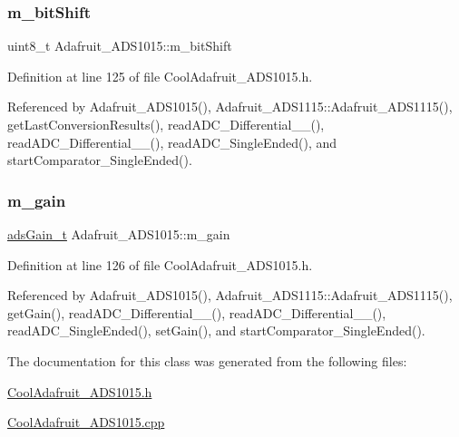 \subsubsection{\texorpdfstring{m\+\_\+bit\+Shift}{m\_bitShift}}
{\footnotesize\ttfamily uint8\+\_\+t Adafruit\+\_\+\+A\+D\+S1015\+::m\+\_\+bit\+Shift\hspace{0.3cm}{\ttfamily [protected]}}



Definition at line 125 of file Cool\+Adafruit\+\_\+\+A\+D\+S1015.\+h.



Referenced by Adafruit\+\_\+\+A\+D\+S1015(), Adafruit\+\_\+\+A\+D\+S1115\+::\+Adafruit\+\_\+\+A\+D\+S1115(), get\+Last\+Conversion\+Results(), read\+A\+D\+C\+\_\+\+Differential\+\_\+\_(), read\+A\+D\+C\+\_\+\+Differential\+\_\+\_(), read\+A\+D\+C\+\_\+\+Single\+Ended(), and start\+Comparator\+\_\+\+Single\+Ended().

\mbox{\label{class_adafruit___a_d_s1015_a8db90fe03d55a18246984ba2ba5e7f32}} 
\subsubsection{\texorpdfstring{m\+\_\+gain}{m\_gain}}
{\footnotesize\ttfamily \hyperlink{_cool_adafruit___a_d_s1015_8h_a3d6c0e15829a207b9155890811fa4781}{ads\+Gain\+\_\+t} Adafruit\+\_\+\+A\+D\+S1015\+::m\+\_\+gain\hspace{0.3cm}{\ttfamily [protected]}}



Definition at line 126 of file Cool\+Adafruit\+\_\+\+A\+D\+S1015.\+h.



Referenced by Adafruit\+\_\+\+A\+D\+S1015(), Adafruit\+\_\+\+A\+D\+S1115\+::\+Adafruit\+\_\+\+A\+D\+S1115(), get\+Gain(), read\+A\+D\+C\+\_\+\+Differential\+\_\+\_(), read\+A\+D\+C\+\_\+\+Differential\+\_\+\_(), read\+A\+D\+C\+\_\+\+Single\+Ended(), set\+Gain(), and start\+Comparator\+\_\+\+Single\+Ended().



The documentation for this class was generated from the following files\+:\begin{DoxyCompactItemize}
\item 
\hyperlink{_cool_adafruit___a_d_s1015_8h}{Cool\+Adafruit\+\_\+\+A\+D\+S1015.\+h}\item 
\hyperlink{_cool_adafruit___a_d_s1015_8cpp}{Cool\+Adafruit\+\_\+\+A\+D\+S1015.\+cpp}\end{DoxyCompactItemize}
